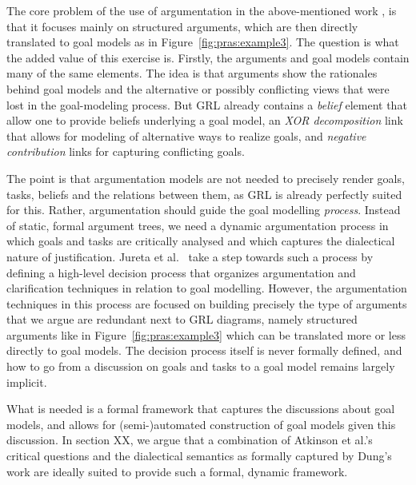 The core problem of the use of argumentation in the above-mentioned work \cite{Jureta:RE2008,vanzee-etal:renext2015,vanZee-etal:er2016}, is that it focuses mainly on structured arguments, which are then directly translated to goal models as in Figure~\ref{fig:pras:example3}. The question is what the added value of this exercise is. Firstly, the arguments and goal models contain many of the same elements. The idea is that arguments show the rationales behind goal models and the alternative or possibly conflicting views that were lost in the goal-modeling process. But GRL already contains a \emph{belief} element that allow one to provide beliefs underlying a goal model, an \emph{XOR decomposition} link that allows for modeling of alternative ways to realize goals, and \emph{negative contribution} links for capturing conflicting goals. 

The point is that argumentation models are not needed to precisely render goals, tasks, beliefs and the relations between them, as GRL is already perfectly suited for this. Rather, argumentation should guide the goal modelling \emph{process}. Instead of static, formal argument trees, we need a dynamic argumentation process in which goals and tasks are critically analysed and which captures the dialectical nature of justification. Jureta et al.~\cite{Jureta:RE2008} take a step towards such a process by defining a high-level decision process that organizes argumentation and clarification techniques in relation to goal modelling. However, the argumentation techniques in this process are focused on building precisely the type of arguments that we argue are redundant next to GRL diagrams, namely structured arguments like in Figure~\ref{fig:pras:example3} which can be translated more or less directly to goal models. The decision process itself is never formally defined, and how to go from a discussion on goals and tasks to a goal model remains largely implicit. 

What is needed is a formal framework that captures the discussions about goal models, and allows for (semi-)automated construction of goal models given this discussion. In section XX, we argue that a combination of Atkinson et al.'s~\cite{atkinson2007} critical questions and the dialectical semantics as formally captured by Dung's work \cite{Dung1995} are ideally suited to provide such a formal, dynamic framework.  

